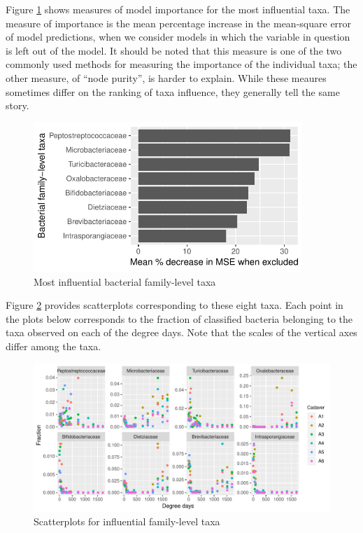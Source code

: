 \documentclass{article}
\begin{document}
Figure \ref{fig:infl_bac_family_taxa} shows measures of model
importance for the most influential taxa.  The measure of
importance is the mean percentage increase in the mean-square error of
model predictions, when we consider models in which the variable in
question is left out of the model.  It should be noted that this
measure is one of the two commonly used methods for measuring the
importance of the individual taxa; the other measure, of ``node
purity'', is harder to explain.  While these meaures sometimes differ
on the ranking of taxa influence, they generally tell the same story.
\begin{figure}
  \centering
  \includegraphics[width=4in]{../revise_algorithm/only_families/all_time_steps/hit_1perc_twice/orig_units_all_data_families_PercIncMSE_barchart}
  \caption{Most influential bacterial family-level taxa}
  \label{fig:infl_bac_family_taxa}
\end{figure}

Figure \ref{fig:infl_bac_family_scatter} provides scatterplots
corresponding to these eight taxa.  Each point in the plots below
corresponds to the fraction of classified bacteria belonging to the
taxa observed on each of the degree days.  Note that the scales of the
vertical axes differ among the taxa.
\begin{figure}
  \centering
  \includegraphics[width=7.5in]{../revise_algorithm/only_families/all_time_steps/hit_1perc_twice/infl_bac_family_all_data_scatter}
  \caption{Scatterplots for influential family-level taxa}
  \label{fig:infl_bac_family_scatter}
\end{figure}
\end{document}
